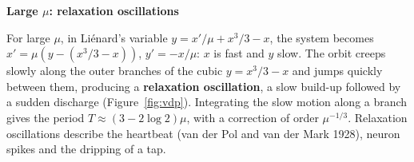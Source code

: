 \documentclass[11pt,a4paper]{article}
\numberwithin{equation}{section}
\theoremstyle{definition}
\newcommand{\subhead}[1]{%
  \par\medskip\noindent\textbf{#1}\par\nobreak\smallskip}
\begin{document}
\subhead{Large $\mu$: relaxation oscillations}
For large $\mu$, in Li\'enard's variable $y = x'/\mu + x^3/3 - x$, the system becomes $x' = \mu(y - (x^3/3 - x))$, $y' = -x/\mu$: $x$ is fast and $y$ slow. The orbit creeps slowly along the outer branches of the cubic
$y = x^3/3 - x$ and jumps quickly between them, producing a \textbf{relaxation oscillation}, a slow build-up followed by a sudden discharge (Figure~\ref{fig:vdp}). Integrating the slow motion along
a branch gives the period $T \approx (3 - 2\log2)\mu$, with a correction of order $\mu^{-1/3}$. Relaxation oscillations describe the heartbeat (van der Pol and van der Mark 1928), neuron spikes and the
dripping of a tap.

\begin{figure}[H]
\centering
{}
\end{figure}
\end{document}
